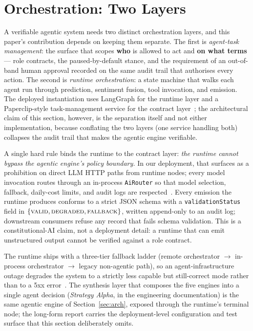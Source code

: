 \documentclass[11pt,a4paper]{article}
\begin{document}
\section{Orchestration: Two Layers}\label{sec:langgraph}

A verifiable agentic system needs two distinct orchestration layers,
and this paper's contribution depends on keeping them separate. The
first is \emph{agent-task management}: the surface that scopes
\textbf{who} is allowed to act and \textbf{on what terms} --- role
contracts, the paused-by-default stance, and the requirement of an
out-of-band human approval recorded on the same audit trail that
authorises every action. The second is \emph{runtime orchestration}: a
state machine that walks each agent run through prediction, sentiment
fusion, tool invocation, and emission. The deployed instantiation uses
LangGraph for the runtime layer and a Paperclip-style task-management
service for the contract layer~\cite{omnirisk2026agentic}; the
architectural claim of this section, however, is the separation itself
and not either implementation, because conflating the two layers (one
service handling both) collapses the audit trail that makes the agentic
engine verifiable.

A single hard rule binds the runtime to the contract layer: \emph{the
runtime cannot bypass the agentic engine's policy boundary.} In our
deployment, that surfaces as a prohibition on direct LLM HTTP paths
from runtime nodes; every model invocation routes through an in-process
\texttt{AiRouter} so that model selection, fallback, daily-cost limits,
and audit logs are respected~\cite{omnirisk2026agentic}. Every emission
the runtime produces conforms to a strict JSON schema with a
\texttt{validationStatus} field in $\{\textsc{valid}, \textsc{degraded},
\textsc{fallback}\}$, written append-only to an audit log; downstream
consumers refuse any record that fails schema validation. This is a
constitutional-AI claim, not a deployment detail: a runtime that can
emit unstructured output cannot be verified against a role contract.

The runtime ships with a three-tier fallback ladder (remote orchestrator
$\to$ in-process orchestrator $\to$ legacy non-agentic path), so an
agent-infrastructure outage degrades the system to a strictly less
capable but still-correct mode rather than to a 5xx
error~\cite{omnirisk2026agentic}. The synthesis layer that composes the
five engines into a single agent decision (\emph{Strategy Alpha}, in
the engineering documentation) is the same agentic engine of
Section~\ref{sec:arch}, exposed through the runtime's terminal node;
the long-form report carries the deployment-level configuration and
test surface that this section deliberately omits.
\end{document}
